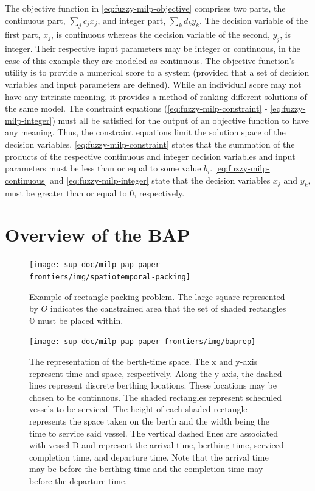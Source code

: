 \documentclass[ee,thesis]{usuthesis}
\begin{document}
The objective function in \ref{eq:fuzzy-milp-objective} comprises two parts, the continuous part, \(\sum_j c_j x_j\), and
integer part, \(\sum_k d_k y_k\). The decision variable of the first part, \(x_j\), is continuous whereas the decision variable
of the second, \(y_j\), is integer. Their respective input parameters may be integer or continuous, in the case of this
example they are modeled as continuous. The objective function's utility is to provide a numerical score to a system
(provided that a set of decision variables and input parameters are defined). While an individual score may not have any
intrinsic meaning, it provides a method of ranking different solutions of the same model. The constraint equations
(\ref{eq:fuzzy-milp-constraint} - \ref{eq:fuzzy-milp-integer}) must all be satisfied for the output of an objective
function to have any meaning. Thus, the constraint equations limit the solution space of the decision variables.
\ref{eq:fuzzy-milp-constraint} states that the summation of the products of the respective continuous and integer
decision variables and input parameters must be less than or equal to some value \(b_i\). \ref{eq:fuzzy-milp-continuous}
and \ref{eq:fuzzy-milp-integer} state that the decision variables \(x_j\) and \(y_k\), must be greater than or equal to 0,
respectively.

\section{Overview of the BAP}
\label{sec:overview-of-the-bap}
\begin{figure}
  \centering
  \texttt{[image: sup-doc/milp-pap-paper-frontiers/img/spatiotemporal-packing]}
  \caption{Example of rectangle packing problem. The large square represented by $O$ indicates the canstrained area that the set of shaded rectangles $\mathbb{O}$ must be placed within.}
  \label{fig:packexample}
\end{figure}

\begin{figure}
  \centering
  \texttt{[image: sup-doc/milp-pap-paper-frontiers/img/baprep]}
  \caption{The representation of the berth-time space. The x and y-axis represent time and space, respectively. Along the y-axis, the dashed lines represent discrete berthing locations. These locations may be chosen to be continuous. The shaded rectangles represent scheduled vessels to be serviced. The height of each shaded rectangle represents the space taken on the berth and the width being the time to service said vessel. The vertical dashed lines are associated with vessel D and represent the arrival time, berthing time, serviced completion time, and departure time. Note that the arrival time may be before the berthing time and the completion time may before the departure time.}
  \label{fig:bap}
\end{figure}
\end{document}
